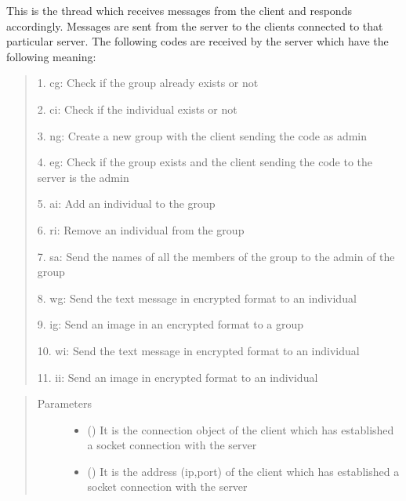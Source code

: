\documentclass[letterpaper,10pt,english]{sphinxmanual}
\begin{document}
\begin{fulllineitems}
\label{\detokenize{server:server.clientthread}}
\sphinxAtStartPar
This is the thread which receives messages from the client and responds accordingly.
Messages are sent from the server to the clients connected to that particular server.
The following codes are received by the server which have the following meaning:
\begin{quote}

\begin{DUlineblock}{0em}
\item[] 1. cg: Check if the group already exists or not
\item[] 2. ci: Check if the individual exists or not
\item[] 3. ng: Create a new group with the client sending the code as admin
\item[] 4. eg: Check if the group exists and the client sending the code to the server is the admin
\item[] 5. ai: Add an individual to the group
\item[] 6. ri: Remove an individual from the group
\item[] 7. sa: Send the names of all the members of the group to the admin of the group
\item[] 8. wg: Send the text message in encrypted format to an individual
\item[] 9. ig: Send an image in an encrypted format to a group
\item[] 10. wi: Send the text message in encrypted format to an individual
\item[] 11. ii: Send an image in encrypted format to an individual
\end{DUlineblock}
\end{quote}
\begin{quote}\begin{description}
\item[{Parameters}] \leavevmode\begin{itemize}
\item {} 
\sphinxAtStartPar
{} () \textendash{} It is the connection object of the client which has established a socket connection with the server

\item {} 
\sphinxAtStartPar
{} () \textendash{} It is the address (ip,port) of the client which has established a socket connection with the server

\end{itemize}

\end{description}\end{quote}

\end{fulllineitems}
\end{document}
